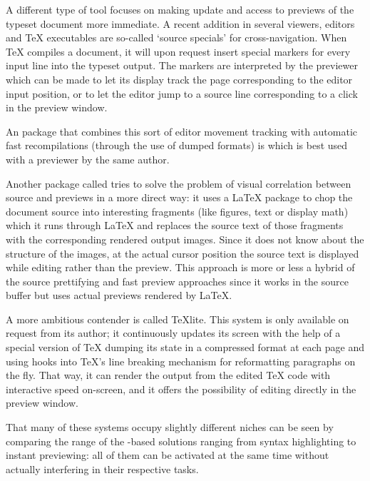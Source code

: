 A different type of tool focuses on making update and access to
previews of the typeset document more immediate.  A recent addition
in several viewers, editors and \TeX{} executables are so-called
`source specials' for cross-navigation.  When \TeX{} compiles a
document, it will upon request insert special markers for every input
line into the typeset output.  The markers are interpreted by the 
previewer which can be made to let its display track the page
corresponding to the editor input position, or to let the editor jump
to a source line corresponding to a click in the preview window.

An  package that combines this sort of editor movement
tracking with automatic fast recompilations (through the use of dumped
formats) is
\href{http://pauillac.inria.fr/whizzytex/}{}
 which is best used with a previewer by the
same author.

Another  package called
\href{http://preview-latex.sourceforge.net}{}
tries to solve
the problem of visual correlation between source and previews in a
more direct way: it uses a \LaTeX{} package to chop the document source
into interesting fragments (like figures, text or display math) which
it runs through \LaTeX{} and replaces the source text of those
fragments with the corresponding rendered output images.  Since it
does not know about the structure of the images, at the actual cursor
position the source text is displayed while editing rather than the
preview.  This approach is more or less a hybrid of the source
prettifying and fast preview approaches since it works in the source
buffer but uses actual previews rendered by \LaTeX{}.

A more ambitious contender is called \TeX{}lite.  This
system is only available on request from its author;
it continuously updates its screen with the help of a special version
of \TeX{} dumping its state in a compressed format at each page and
using hooks into \TeX{}'s line breaking mechanism for reformatting
paragraphs on the fly.  That way, it can render the output from the
edited \TeX{} code with interactive speed on-screen, and it offers the
possibility of editing directly in the preview window.

That many of these systems occupy slightly different niches can be
seen by comparing the range of the
-based solutions ranging from syntax highlighting to instant
previewing: all of them can be activated at the same time without
actually interfering in their respective tasks.

